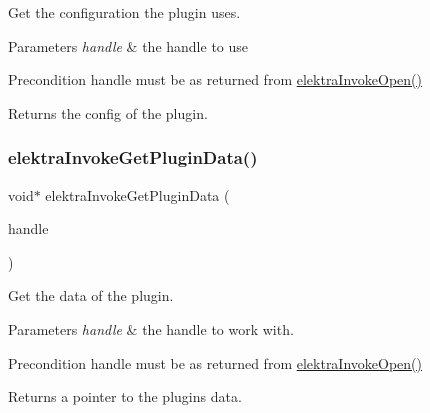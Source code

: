 Get the configuration the plugin uses. 


\begin{DoxyParams}{Parameters}
{\em handle} & the handle to use\\
\hline
\end{DoxyParams}
\begin{DoxyPrecond}{Precondition}
handle must be as returned from \hyperlink{group__invoke_ga3eb20131e9a8fc9a6cebf126927c09bc}{elektra\+Invoke\+Open()}
\end{DoxyPrecond}
\begin{DoxyReturn}{Returns}
the config of the plugin. 
\end{DoxyReturn}
\mbox{\label{group__invoke_gac615e211a4d3c77addfa18152c274345}} 
\subsubsection{\texorpdfstring{elektra\+Invoke\+Get\+Plugin\+Data()}{elektraInvokeGetPluginData()}}
{\footnotesize\ttfamily void$\ast$ elektra\+Invoke\+Get\+Plugin\+Data (\begin{DoxyParamCaption}\item[{Elektra\+Invoke\+Handle $\ast$}]{handle }\end{DoxyParamCaption})}



Get the data of the plugin. 


\begin{DoxyParams}{Parameters}
{\em handle} & the handle to work with.\\
\hline
\end{DoxyParams}
\begin{DoxyPrecond}{Precondition}
handle must be as returned from \hyperlink{group__invoke_ga3eb20131e9a8fc9a6cebf126927c09bc}{elektra\+Invoke\+Open()}
\end{DoxyPrecond}
\begin{DoxyReturn}{Returns}
a pointer to the plugin\textquotesingle{}s data. 
\end{DoxyReturn}
\mbox{\label{group__invoke_ga13bd3afe428624d459239df73641d769}} 
